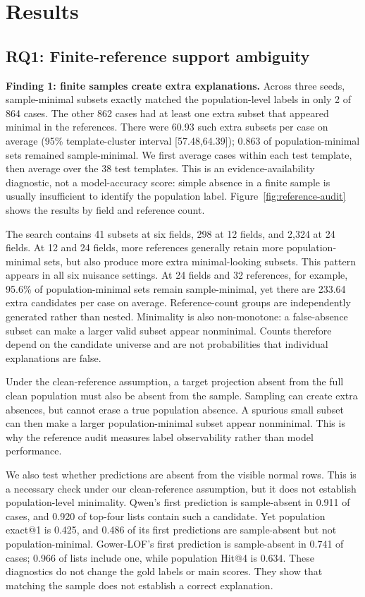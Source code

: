 \documentclass[conference]{IEEEtran}
\begin{document}
\section{Results}
\subsection{RQ1: Finite-reference support ambiguity}
\textbf{Finding 1: finite samples create extra explanations.} Across three seeds, sample-minimal subsets exactly matched the population-level labels in only 2 of 864 cases. The other 862 cases had at least one extra subset that appeared minimal in the references. There were 60.93 such extra subsets per case on average (95\% template-cluster interval [57.48,64.39]); 0.863 of population-minimal sets remained sample-minimal. We first average cases within each test template, then average over the 38 test templates. This is an evidence-availability diagnostic, not a model-accuracy score: simple absence in a finite sample is usually insufficient to identify the population label. Figure~\ref{fig:reference-audit} shows the results by field and reference count.

The search contains 41 subsets at six fields, 298 at 12 fields, and 2,324 at 24 fields. At 12 and 24 fields, more references generally retain more population-minimal sets, but also produce more extra minimal-looking subsets. This pattern appears in all six nuisance settings. At 24 fields and 32 references, for example, 95.6\% of population-minimal sets remain sample-minimal, yet there are 233.64 extra candidates per case on average. Reference-count groups are independently generated rather than nested. Minimality is also non-monotone: a false-absence subset can make a larger valid subset appear nonminimal. Counts therefore depend on the candidate universe and are not probabilities that individual explanations are false.

Under the clean-reference assumption, a target projection absent from the full clean population must also be absent from the sample. Sampling can create extra absences, but cannot erase a true population absence. A spurious small subset can then make a larger population-minimal subset appear nonminimal. This is why the reference audit measures label observability rather than model performance.

We also test whether predictions are absent from the visible normal rows. This is a necessary check under our clean-reference assumption, but it does not establish population-level minimality. Qwen's first prediction is sample-absent in 0.911 of cases, and 0.920 of top-four lists contain such a candidate. Yet population exact@1 is 0.425, and 0.486 of its first predictions are sample-absent but not population-minimal. Gower-LOF's first prediction is sample-absent in 0.741 of cases; 0.966 of lists include one, while population Hit@4 is 0.634. These diagnostics do not change the gold labels or main scores. They show that matching the sample does not establish a correct explanation.
\end{document}
